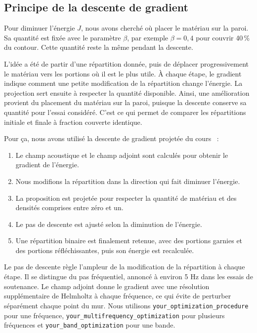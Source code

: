 \documentclass[11pt,a4paper]{article}
\newcommand{\code}[1]{\begingroup\def\UrlBreaks{\do\_\do\/\do\.}\nolinkurl{#1}\endgroup}
\begin{document}
\subsection{Principe de la descente de gradient}
Pour diminuer l'énergie $J$, nous avons cherché où placer le matériau sur la paroi. Sa quantité est fixée avec le paramètre $\beta$, par exemple $\beta=0{,}4$ pour couvrir 40\,\% du contour. Cette quantité reste la même pendant la descente.

L'idée a été de partir d'une répartition donnée, puis de déplacer progressivement le matériau vers les portions où il est le plus utile. À chaque étape, le gradient indique comment une petite modification de la répartition change l'énergie. La projection sert ensuite à respecter la quantité disponible. Ainsi, une amélioration provient du placement du matériau sur la paroi, puisque la descente conserve sa quantité pour l'essai considéré. C'est ce qui permet de comparer les répartitions initiale et finale à fraction couverte identique.

Pour ça, nous avons utilisé la descente de gradient projetée du cours~\cite{cours} :
\begin{enumerate}
    \setlength{\itemsep}{0pt}
    \item Le champ acoustique et le champ adjoint sont calculés pour obtenir le gradient de l'énergie.
    \item Nous modifions la répartition dans la direction qui fait diminuer l'énergie.
    \item La proposition est projetée pour respecter la quantité de matériau et des densités comprises entre zéro et un.
    \item Le pas de descente est ajusté selon la diminution de l'énergie.
    \item Une répartition binaire est finalement retenue, avec des portions garnies et des portions réfléchissantes, puis son énergie est recalculée.
\end{enumerate}
Le pas de descente règle l'ampleur de la modification de la répartition à chaque étape. Il se distingue du pas fréquentiel, annoncé à environ 5 Hz dans les essais de soutenance. Le champ adjoint donne le gradient avec une résolution supplémentaire de Helmholtz à chaque fréquence, ce qui évite de perturber séparément chaque point du mur. Nous utilisons \code{your_optimization_procedure} pour une fréquence, \code{your_multifrequency_optimization} pour plusieurs fréquences et \code{your_band_optimization} pour une bande.
\end{document}
